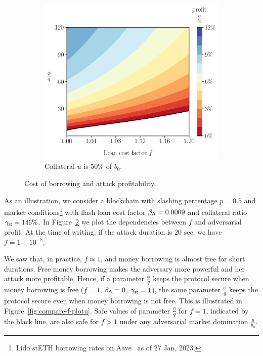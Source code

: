 \begin{figure}[htb]
\begin{subfigure}{0.49\textwidth}
     \includegraphics[width=\textwidth]{./plots/plotf50.pdf}
     \caption{Collateral $u$ is $50\%$ of $b_0$.}
     \label{fig:plotf50}
   \end{subfigure}
   \caption{Cost of borrowing and attack profitability.}
   \label{fig:plotf}
 \end{figure}

 As an illustration,
 we consider a blockchain with slashing percentage
 $p = 0.5$ and market conditions\footnote{Lido stETH borrowing rates
 on Aave~\cite{aave} as of 27 Jan, 2023.}
 with \asset flash loan cost factor $\beta_{\textsf{A}} = 0.0009$ and
 collateral ratio $\gamma_{\textsf{st}} = 146\%$.
 In Figure~\ref{fig:plotf} we plot the dependencies between $f$ and adversarial
 profit. At the time of writing, if the attack duration is $20$ sec, we have
 $f = 1 + 10^{-8}$.

We saw that, in practice, $f \simeq 1$, and money borrowing is almost free
for short durations. Free money borrowing makes the adversary more powerful
and her attack more profitable.
Hence, if a parameter $\frac{\phi}{q}$ keeps the protocol secure when money
borrowing is free ($f = 1$, $\beta_{\textsf{A}} = 0$, $\gamma_{\textsf{st}} = 1$),
the same parameter $\frac{\phi}{q}$ keeps the protocol secure even when
money borrowing is not free. This is illustrated in
Figure~\ref{fig:compare-f-plotu}. Safe values of parameter $\frac{\phi}{q}$
for $f = 1$, indicated by the black line, are also safe for $f > 1$
under any adversarial market domination $\frac{u}{b_0}$.

